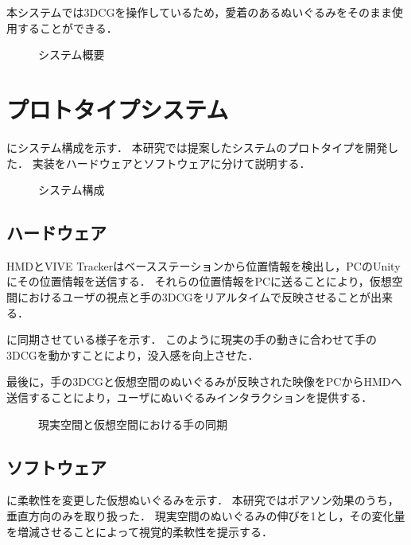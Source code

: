 \documentclass[uplatex]{jsarticle}   %
\begin{document}
本システムでは3DCGを操作しているため，愛着のあるぬいぐるみをそのまま使用することができる．

\begin{figure}[t]
    \centering
    \caption{システム概要}\label{fig:gaiyou}
\end{figure}

\section{プロトタイプシステム}
にシステム構成を示す．
本研究では提案したシステムのプロトタイプを開発した．
実装をハードウェアとソフトウェアに分けて説明する．
\begin{figure}[t]
    \centering
    \caption{システム構成}\label{fig:kousei}
\end{figure}

    \subsection{ハードウェア}
    HMDとVIVE Trackerはベースステーションから位置情報を検出し，PCのUnityにその位置情報を送信する．
    それらの位置情報をPCに送ることにより，仮想空間におけるユーザの視点と手の3DCGをリアルタイムで反映させることが出来る．
    
    に同期させている様子を示す．
    このように現実の手の動きに合わせて手の3DCGを動かすことにより，没入感を向上させた．

    最後に，手の3DCGと仮想空間のぬいぐるみが反映された映像をPCからHMDへ送信することにより，ユーザにぬいぐるみインタラクションを提供する．

    \begin{figure}[t]
        \centering
        \caption{現実空間と仮想空間における手の同期}\label{fig:douki}
    \end{figure}

    \subsection{ソフトウェア}
    に柔軟性を変更した仮想ぬいぐるみを示す．
    本研究ではポアソン効果のうち，垂直方向のみを取り扱った．
    現実空間のぬいぐるみの伸びを1とし，その変化量を増減させることによって視覚的柔軟性を提示する．
\end{document}
